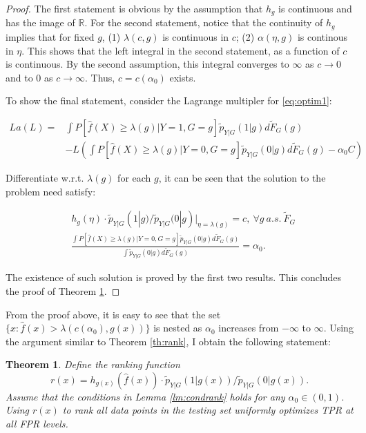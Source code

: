 \documentclass{article} %
\newtheorem{theorem}{Theorem}
\begin{document}
\begin{proof}
The first statement is obvious by the assumption that $h_g$ is continuous and has the image of $\mathbb R$. For the second statement, notice that the continuity of $h_g$ implies that for fixed $g$, (1) $\lambda(c,g)$ is continuous in $c$; (2) $\alpha(\eta,g)$ is continous in $\eta$. This shows that the left integral in the second statement, as a function of $c$ is continuous. By the second assumption, this integral converges to $\infty$ as $c\rightarrow 0$ and to 0 as $c\rightarrow \infty$. Thus, $c=c(\alpha_0)$ exists.

To show the final statement, consider the Lagrange multipler for \ref{eq:optim1}:

\[
\begin{split}
La(L)=&\int P[\hat f(X) \geq \lambda(g)|Y=1,G=g]\tilde p_{Y|G}(1|g)d\tilde F_G(g)\\
&-L(\int P[\hat f(X) \geq \lambda(g)|Y=0,G=g]\tilde p_{Y|G}(0|g) d\tilde F_G(g)-\alpha_0C)
\end{split}
\]

Differentiate w.r.t. $\lambda(g)$ for each $g$, it can be seen that the solution to the problem need satisfy:

\[
\begin{split}
&h_g(\eta)\cdot \tilde p_{Y|G}(1|g)/\tilde p_{Y|G}(0|g)|_{\eta=\lambda(g)}=c,~\forall g~a.s.~\tilde F_G\\
&\frac{\int P[\hat f(X) \geq \lambda(g)|Y=0,G=g] \tilde p_{Y|G}(0|g) d\tilde F_G(g)}{\int \tilde p_{Y|G}(0|g)d\tilde F_G(g)} = \alpha_0.
\end{split}
\]

The existence of such solution is proved by the first two results. This concludes the proof of Theorem \ref{th:condrank}.
\end{proof}

From the proof above, it is easy to see that the set $\{x:\hat f(x)>\lambda(c(\alpha_0),g(x))\}$ is nested as $\alpha_0$ increases from $-\infty$ to $\infty$. Using the argument similar to Theorem \ref{th:rank}, I obtain the following statement:

\begin{theorem}\label{th:condrank}
Define the ranking function
\begin{equation}\label{eq:rx}
r(x)=h_{g(x)}(\hat f(x))\cdot \tilde p_{Y|G}(1|g(x))/\tilde p_{Y|G}(0|g(x)).
\end{equation}
Assume that the conditions in Lemma \ref{lm:condrank} holds for any $\alpha_0\in(0,1)$. Using $r(x)$ to rank all data points in the testing set uniformly optimizes TPR at all FPR levels.
\end{theorem}
\end{document}
